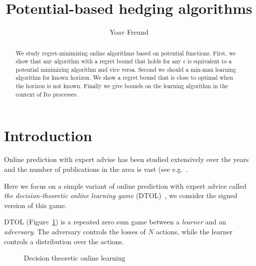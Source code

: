 \documentclass{article}[12pt]
\title{Potential-based hedging algorithms}
\author{Yoav Freund}
\begin{document}
\maketitle
\begin{abstract}

  We study regret-minimizing online algorithms based on potential
functions. First, we show that any algorithm with a regret bound that
holds for any $\epsilon$ is equivalent to a potential minimizing
algorithm and vice versa. Second we should a min-max learning
algorithm for known horizon. We show a regret bound that is close to
optimal when the horizon is not known. Finally we give bounds on the
learning algorithm in the context of Ito processes.
\end{abstract}

\section{Introduction}
Online prediction with expert advise has been studied extensively over
the years and the number of publications in the area is vast (see
e.g.~\cite{vovk1990aggregating, feder1992universal,
  littlestone1994weighted, cesa1997use, cesa2006prediction}.

Here we focus on a simple variant of online prediction with expert
advice called {\em the decision-theoretic online learning game}
(DTOL)~\cite{freund1997decision}, we  consider the 
  signed version of this game.

DTOL (Figure~\ref{fig:DTOL}) is a repeated zero sum game between a {\em learner} and an {\em
  adversary}. The adversary controls the losses of $N$ actions, while
the learner controls a distribution over the actions.

\begin{figure}[ht!]
\caption{Decision theoretic online learning \label{fig:DTOL}}
\end{figure}
\end{document}
